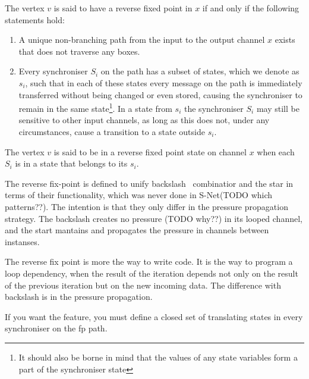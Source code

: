 \begin{definition} The vertex $v$ is said to have a reverse fixed point in $x$ if and only if the following statements hold:

\begin{enumerate}
\item A unique non-branching path from the input to the output channel $x$ exists that does not traverse any boxes.

\item Every synchroniser $S_i$ on the path has a subset of states, which we denote as $s_i$, such that in each of these states every message on the path is immediately transferred without being changed or even stored, causing the synchroniser to remain in the same state\footnote{It should also be borne in mind that the values of any state variables form a part of the synchroniser state}. In a state from $s_i$ the synchroniser $S_i$ may still be sensitive to other input channels, as long as this does not, under any circumstances, cause a transition to a state outside $s_i$.
\end{enumerate}
\end{definition}

The vertex $v$ is said to be in a reverse fixed point state on channel $x$ when each $S_i$ is in a state that belongs to its $s_i$.

The reverse fix-point is defined to unify backslash \ combinatior and the star in terms of their functionality, which was never done in S-Net(TODO which patterns??). The intention is that they only differ in the pressure propagation strategy. The backslash creates no pressure (TODO why??) in its looped channel, and the start mantains and propagates the pressure in channels between instanses.

%
%
%
%

The reverse fix point is more the way to write code. It is the way to program a loop dependency, when the result of the iteration depends not only on the result of the previous iteration but on the new incoming data. The difference with backslash is in the pressure propagation.

If you want the feature, you must define a closed set of translating states in every synchroniser on the fp path.


